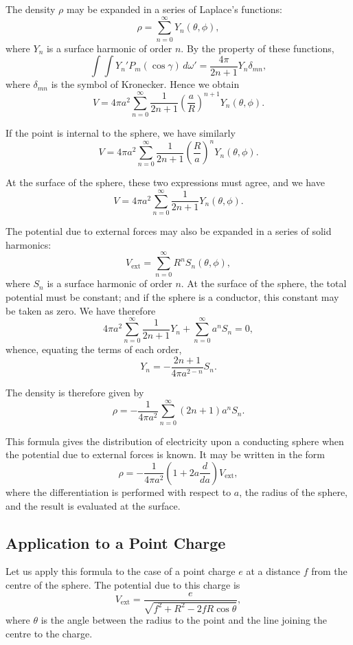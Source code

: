 \documentclass[11pt,a4paper]{article}
\begin{document}
\setcounter{page}{94}

The density $\rho$ may be expanded in a series of Laplace's functions:
\[
\rho = \sum_{n=0}^{\infty} Y_n(\theta,\phi),
\]
where $Y_n$ is a surface harmonic of order $n$. By the property of these functions,
\[
\int\!\!\int Y_n' P_m(\cos\gamma) \, d\omega' = \frac{4\pi}{2n+1} Y_n \delta_{mn},
\]
where $\delta_{mn}$ is the symbol of Kronecker. Hence we obtain
\[
V = 4\pi a^2 \sum_{n=0}^{\infty} \frac{1}{2n+1} \left(\frac{a}{R}\right)^{n+1} Y_n(\theta,\phi).
\]

If the point is internal to the sphere, we have similarly
\[
V = 4\pi a^2 \sum_{n=0}^{\infty} \frac{1}{2n+1} \left(\frac{R}{a}\right)^{n} Y_n(\theta,\phi).
\]

\setcounter{page}{95}

At the surface of the sphere, these two expressions must agree, and we have
\[
V = 4\pi a^2 \sum_{n=0}^{\infty} \frac{1}{2n+1} Y_n(\theta,\phi).
\]

The potential due to external forces may also be expanded in a series of solid harmonics:
\[
V_{\text{ext}} = \sum_{n=0}^{\infty} R^n S_n(\theta,\phi),
\]
where $S_n$ is a surface harmonic of order $n$. At the surface of the sphere, the total potential must be constant; and if the sphere is a conductor, this constant may be taken as zero. We have therefore
\[
4\pi a^2 \sum_{n=0}^{\infty} \frac{1}{2n+1} Y_n + \sum_{n=0}^{\infty} a^n S_n = 0,
\]
whence, equating the terms of each order,
\[
Y_n = -\frac{2n+1}{4\pi a^{2-n}} S_n.
\]

\setcounter{page}{96}

The density is therefore given by
\[
\rho = -\frac{1}{4\pi a^2} \sum_{n=0}^{\infty} (2n+1) a^n S_n.
\]

This formula gives the distribution of electricity upon a conducting sphere when the potential due to external forces is known. It may be written in the form
\[
\rho = -\frac{1}{4\pi a^2} \left(1 + 2a\frac{d}{da}\right) V_{\text{ext}},
\]
where the differentiation is performed with respect to $a$, the radius of the sphere, and the result is evaluated at the surface.

\subsection*{Application to a Point Charge}

Let us apply this formula to the case of a point charge $e$ at a distance $f$ from the centre of the sphere. The potential due to this charge is
\[
V_{\text{ext}} = \frac{e}{\sqrt{f^2 + R^2 - 2fR\cos\theta}},
\]
where $\theta$ is the angle between the radius to the point and the line joining the centre to the charge.
\end{document}
